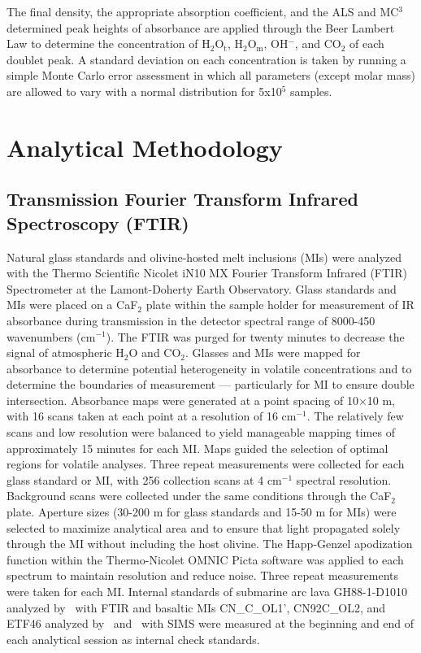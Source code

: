 \documentclass[draft]{agujournal2019}
\begin{document}
The final density, the appropriate absorption coefficient, and the ALS and MC$^3$ determined peak heights of absorbance are applied through the Beer Lambert Law to determine the concentration of H$_{2}$O$_{\mathrm{t}}$, H$_{2}$O$_{\mathrm{m}}$, OH$^{-}$, and CO$_{2}$ of each doublet peak. A standard deviation on each concentration is taken by running a simple Monte Carlo error assessment in which all parameters (except molar mass) are allowed to vary with a normal distribution for 5x10$^{5}$ samples.



\section{Analytical Methodology} %
\subsection{Transmission Fourier Transform Infrared Spectroscopy (FTIR)}
Natural glass standards and olivine-hosted melt inclusions (MIs) were analyzed with the Thermo Scientific Nicolet iN10 MX Fourier Transform Infrared (FTIR) Spectrometer at the Lamont-Doherty Earth Observatory. Glass standards and MIs were placed on a CaF$_2$ plate within the sample holder for measurement of IR absorbance during transmission in the detector spectral range of 8000-450 wavenumbers (cm$^{-1}$). The FTIR was purged for twenty minutes to decrease the signal of atmospheric H$_{2}$O and CO$_{2}$. Glasses and MIs were mapped for absorbance to determine potential heterogeneity in volatile concentrations and to determine the boundaries of measurement — particularly for MI to ensure double intersection. Absorbance maps were generated at a point spacing of 10$\times$10 \textmu m, with 16 scans taken at each point at a resolution of 16 cm$^{-1}$. The relatively few scans and low resolution were balanced to yield manageable mapping times of approximately 15 minutes for each MI. Maps guided the selection of optimal regions for volatile analyses. Three repeat measurements were collected for each glass standard or MI, with 256 collection scans at 4 cm$^{-1}$ spectral resolution. Background scans were collected under the same conditions through the CaF$_{2}$ plate. Aperture sizes (30-200 \textmu m for glass standards and 15-50 \textmu m for MIs) were selected to maximize analytical area and to ensure that light propagated solely through the MI without including the host olivine. The Happ-Genzel apodization function within the Thermo-Nicolet OMNIC Picta software was applied to each spectrum to maintain resolution and reduce noise. Three repeat measurements were taken for each MI. Internal standards of submarine arc lava GH88-1-D1010 analyzed by~ with FTIR and basaltic MIs CN\_C\_OL1’, CN92C\_OL2, and ETF46 analyzed by~ and~ with SIMS were measured at the beginning and end of each analytical session as internal check standards. 
\end{document}
